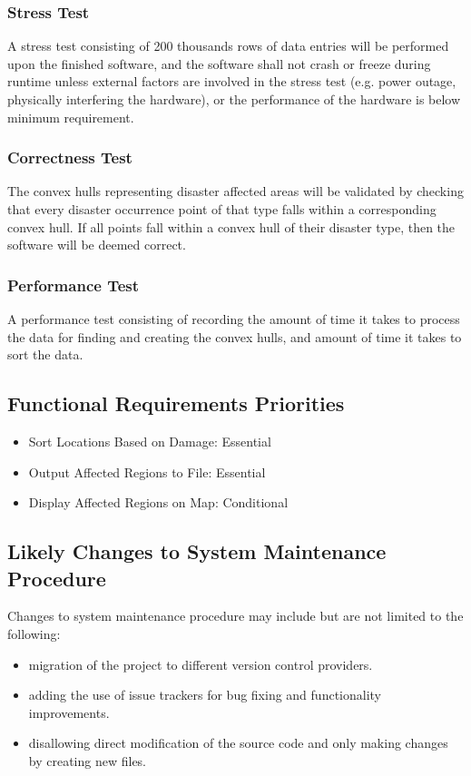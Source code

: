 \documentclass{article}
\begin{document}
    \subsubsection{Stress Test}
    A stress test consisting of 200 thousands rows of data entries will be 
    performed upon the finished software, and the software shall not crash 
    or freeze during runtime unless external factors are involved in the 
    stress test (e.g. power outage, physically interfering the hardware),
    or the performance of the hardware is below minimum requirement.

    \subsubsection{Correctness Test}
    The convex hulls representing disaster affected areas will be validated 
    by checking that every disaster occurrence point of that type falls within a 
    corresponding convex hull. If all points fall within a convex hull of their 
    disaster type, then the software will be deemed correct.

    \subsubsection {Performance Test}
    A performance test consisting of recording the amount of time it takes to 
    process the data for finding and creating the convex hulls, and amount of 
    time it takes to sort the data.
        \subsection{Functional Requirements Priorities}
            \begin{itemize}
                \item Sort Locations Based on Damage: Essential
                \item Output Affected Regions to File: Essential
                \item Display Affected Regions on Map: Conditional
            \end{itemize}
        \subsection{Likely Changes to System Maintenance Procedure}
            Changes to system maintenance procedure may include but are not limited to the following:
    \begin{itemize}
    \item migration of the project to different version control providers.
    \item adding the use of issue trackers for bug fixing and functionality improvements.
    \item disallowing direct modification of the source code and only making changes by creating new files.
    \end{itemize}
    
\end{document}
